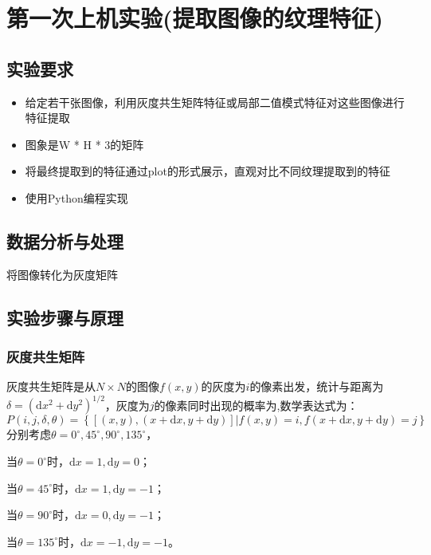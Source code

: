 \documentclass[a4paper,12pt]{report}
\begin{document}
\tableofcontents %

\chapter{第一次上机实验(提取图像的纹理特征)}
\section{实验要求}
\begin{itemize}
    \item 给定若干张图像，利用灰度共生矩阵特征或局部二值模式特征对这些图像进行特征提取
    \item 图象是W * H * 3的矩阵
    \item 将最终提取到的特征通过plot的形式展示，直观对比不同纹理提取到的特征
    \item 使用Python编程实现
\end{itemize}
\section{数据分析与处理}
\par 将图像转化为灰度矩阵
\section{实验步骤与原理}
\subsection{灰度共生矩阵}
灰度共生矩阵是从$N\times N$的图像$f(x,y)$的灰度为$i$的像素出发，统计与距离为$\delta=(\mathrm{d}x^{2}+\mathrm{d}y^{2})^{1/2}$，灰度为$j$的像素同时出现的概率为,数学表达式为：$$P(i,j,\delta,\theta)=\left\{[(x,y),(x+\mathrm{d}x,y+\mathrm{d}y)]|f(x,y)=i,f(x+\mathrm{d}x,y+\mathrm{d}y)=j\right\}$$
分别考虑$\theta=0^{\circ},45^{\circ},90^{\circ},135^{\circ}$，
\par 当$\theta=0^{\circ}$时，$\mathrm{d}x=1,\mathrm{d}y=0$；
\par 当$\theta=45^{\circ}$时，$\mathrm{d}x=1,\mathrm{d}y=-1$；
\par 当$\theta=90^{\circ}$时，$\mathrm{d}x=0,\mathrm{d}y=-1$；
\par 当$\theta=135^{\circ}$时，$\mathrm{d}x=-1,\mathrm{d}y=-1$。
\end{document}
